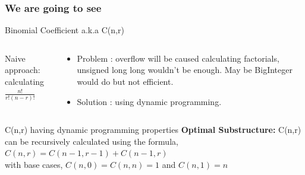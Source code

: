 \documentclass{beamer}
\begin{document}
\begin{frame}
\frametitle{We are going to see}

    \tableofcontents
\end{frame}

\begin{frame}{Binomial Coefficient a.k.a C(n,r)}
\begin{columns}
\begin{column}{0.5\textwidth}
Naive approach: calculating \\
$\frac{n!}{r!(n-r)!}$
\end{column}
\begin{column}{0.5\textwidth}
\begin{itemize}
    \item Problem : overflow will be
caused calculating factorials,
unsigned long long wouldn’t
be enough. May be
BigInteger would do but not
efficient.
\item Solution : using dynamic
programming.
\end{itemize}
\end{column}
\end{columns}
\end{frame}

\begin{frame}{C(n,r) having dynamic programming properties}
    \textbf{Optimal Substructure:} C(n,r) can be recursively calculated using
the formula,\\
$C (n, r ) = C (n-1, r-1) + C (n-1, r )$\\
with base cases, $C(n,0) = C(n,n) = 1$ and $C(n,1) = n$ 
\end{frame}
\end{document}
